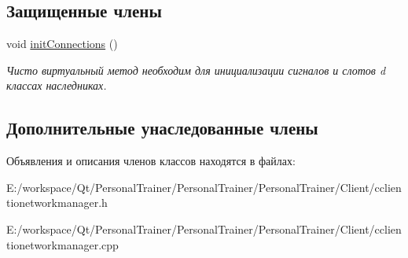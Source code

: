 \subsection*{Защищенные члены}
\begin{DoxyCompactItemize}
\item 
\hypertarget{class_c_client_i_o_network_manager_aeb1564c209ae8b790cf799075cfa6a98}{}\label{class_c_client_i_o_network_manager_aeb1564c209ae8b790cf799075cfa6a98} 
void \hyperlink{class_c_client_i_o_network_manager_aeb1564c209ae8b790cf799075cfa6a98}{init\+Connections} ()
\begin{DoxyCompactList}\small\item\em Чисто виртуальный метод необходим для инициализации сигналов и слотов d классах наследниках. \end{DoxyCompactList}\end{DoxyCompactItemize}
\subsection*{Дополнительные унаследованные члены}


Объявления и описания членов классов находятся в файлах\+:\begin{DoxyCompactItemize}
\item 
E\+:/workspace/\+Qt/\+Personal\+Trainer/\+Personal\+Trainer/\+Personal\+Trainer/\+Client/cclientionetworkmanager.\+h\item 
E\+:/workspace/\+Qt/\+Personal\+Trainer/\+Personal\+Trainer/\+Personal\+Trainer/\+Client/cclientionetworkmanager.\+cpp\end{DoxyCompactItemize}
